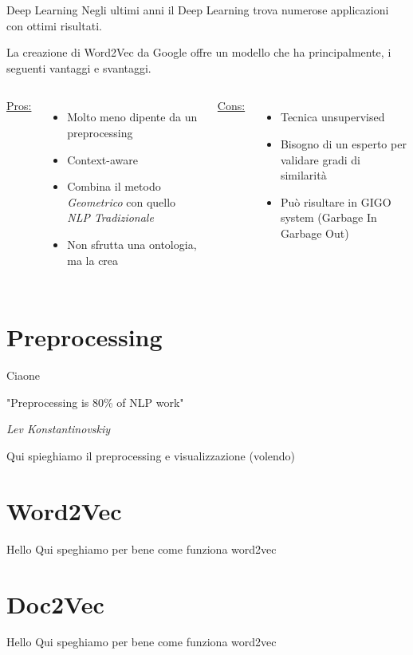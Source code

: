 \documentclass[british]{beamer}
\begin{document}
	\begin{frame}{Deep Learning}
		Negli ultimi anni il Deep Learning trova numerose applicazioni con ottimi risultati.\par
		La creazione di Word2Vec da Google offre un modello che ha principalmente, i seguenti vantaggi e svantaggi.
		\begin{columns}
			\underline{Pros:}
			\begin{itemize}
				\item Molto meno dipente da un preprocessing
				\item Context-aware
				\item Combina il metodo \textit{Geometrico} con quello \textit{NLP Tradizionale}
				\item Non sfrutta una ontologia, ma la \alert{crea} 
			\end{itemize}
			\underline{Cons:}
			\begin{itemize}
				\item Tecnica unsupervised 
				\item Bisogno di un esperto per validare gradi di similarità
				\item Pu\`{o} risultare in GIGO system (Garbage In Garbage Out)
			\end{itemize}
		\end{columns}
	\end{frame}
	
\section{Preprocessing}

\begin{frame}{Ciaone}
	\begin{displayquote}
		"Preprocessing is 80\% of NLP work"
		 
		\begin{flushright}
			\textit{Lev Konstantinovskiy}
		\end{flushright}
	\end{displayquote}
		
	Qui spieghiamo il preprocessing e visualizzazione (volendo)
\end{frame}

\section{Word2Vec}

\begin{frame}{Hello}
	Qui speghiamo per bene come funziona word2vec
\end{frame}

\section{Doc2Vec}


\begin{frame}{Hello}
	Qui speghiamo per bene come funziona word2vec\end{frame}
\end{document}
